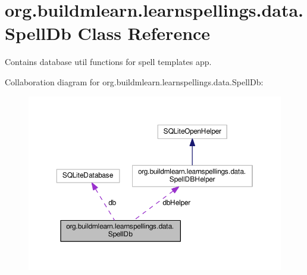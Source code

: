 \hypertarget{classorg_1_1buildmlearn_1_1learnspellings_1_1data_1_1SpellDb}{}\section{org.\+buildmlearn.\+learnspellings.\+data.\+Spell\+Db Class Reference}
\label{classorg_1_1buildmlearn_1_1learnspellings_1_1data_1_1SpellDb}


Contains database util functions for spell template\textquotesingle{}s app.  




Collaboration diagram for org.\+buildmlearn.\+learnspellings.\+data.\+Spell\+Db\+:
\nopagebreak
\begin{figure}[H]
\begin{center}
\leavevmode
\includegraphics[width=350pt]{classorg_1_1buildmlearn_1_1learnspellings_1_1data_1_1SpellDb__coll__graph}
\end{center}
\end{figure}
